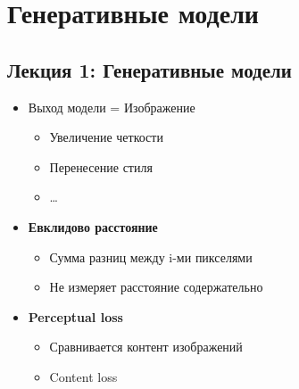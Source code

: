 \documentclass[a4paper, 12pt]{article}
\date{}
\begin{document}
\tableofcontents

\pagebreak

\section{Генеративные модели}

\subsection{Лекция 1: Генеративные модели}

\begin{itemize}
\item
  
  Выход модели = Изображение
  

  \begin{itemize}
  \item
    
    Увеличение четкости
    
  \item
    
    Перенесение стиля
    
  \item
    
    \ldots{}
    
  \end{itemize}
\item
  
  \textbf{Евклидово расстояние}
  

  \begin{itemize}
  \item
    
    Сумма разниц между i-ми пикселями
    
  \item
    
    Не измеряет расстояние содержательно
    
  \end{itemize}
\item
  
  \textbf{Perceptual loss}
  

  \begin{itemize}
  \item
    
    Сравнивается контент изображений
    
  \item
    
    {Content loss}
    
  \end{itemize}
\end{itemize}
\end{document}
